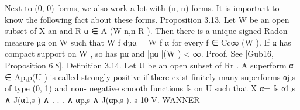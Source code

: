 \documentclass[
  10pt,
]{article}
\newenvironment{Shaded}{}{}
\newcommand{\NormalTok}[1]{#1}
\begin{document}
\begin{Shaded}
\begin{Highlighting}[]
\NormalTok{   Next to (0, 0){-}forms, we also work a lot with (n, n){-}forms. It is important to know the}
\NormalTok{following fact about these forms.}
\NormalTok{Proposition 3.13. Let W be an open subset of X an and   R α ∈ A (W}
\NormalTok{                                                                  n,n}
\NormalTok{                                                                      R ). Then there}
\NormalTok{is a unique signed Radon measure µα on W such that W f dµα = W f α for every}
\NormalTok{f ∈ Cc∞ (W ). If α has compact support on W , so has µα and |µα |(W ) \textless{} ∞.}
\NormalTok{Proof. See [Gub16, Proposition 6.8].                                                                }
\NormalTok{Definition 3.14. Let U be an open subset of Rr . A superform α ∈ Ap,p(U ) is called}
\NormalTok{strongly positive if there exist finitely many superforms αj,s of type (0, 1) and non{-}}
\NormalTok{negative smooth functions fs on U such that}
\NormalTok{                          X}
\NormalTok{                      α=      fs α1,s ∧ J(α1,s ) ∧ . . . ∧ αp,s ∧ J(αp,s ).}
\NormalTok{                                s}
\NormalTok{10                                       V. WANNER}



\end{Highlighting}
\end{Shaded}
\end{document}
